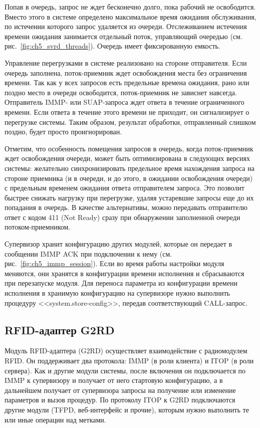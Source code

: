 Попав в очередь, запрос не ждет бесконечно долго, пока рабочий не освободится. Вместо этого в системе определено максимальное время ожидания обслуживания, по истечении которого запрос удаляется из очереди. Отслеживанием истечения времени ожидания занимается отдельный поток, управляющий очередью (см. рис.~\ref{fig:ch5_svrd_threads}). Очередь имеет фиксированную емкость.

Управление перегрузками в системе реализовано на стороне отправителя. Если очередь заполнена, поток-приемник ждет освобождения места без ограничения времени. Так как у всех запросов есть предельные времена ожидания, рано или поздно место в очереди освободится, поток-приемник не зависнет навсегда. Отправитель IMMP- или SUAP-запроса ждет ответа в течение ограниченного времени. Если ответа в течение этого времени не приходит, он сигнализирует о перегрузке системы. Таким образом, результат обработки, отправленный слишком поздно, будет просто проигнорирован.

Отметим, что особенность помещения запросов в очередь, когда поток-приемник ждет освобождения очереди, может быть оптимизирована в следующих версиях системы: желательно синхронизировать предельное время нахождения запроса на стороне приемника (и в очереди, и до этого, в ожидании освобождения очереди) с предельным временем ожидания ответа отправителем запроса. Это позволит быстрее снижать нагрузку при перегрузке, удаляя устаревшие запросы еще до их попадания в очередь. В качестве альтернативы, можно передавать отправителю ответ с кодом 411 (Not Ready) сразу при обнаружении заполненной очереди потоком-приемником.

Супервизор хранит конфигурацию других модулей, которые он передает в сообщении IMMP ACK при подключении к нему (см. рис.~\ref{fig:ch5_immp_session}). Если во время работы настройки модуля меняются, они хранятся в конфигурации времени исполнения и сбрасываются при перезапуске модуля. Для переноса параметра из конфигурации времени исполнения в хранимую конфигурацию на супервизоре нужно выполнить процедуру <<system.store-config>>, передав соответствующий CALL-запрос.


\subsection{RFID-адаптер G2RD}\label{sec:ch5_components_g2rd}

Модуль RFID-адаптера (G2RD) осуществляет взаимодействие с радиомодулем RFID. Он поддерживает два протокола: IMMP (в роли клиента) и ITOP (в роли сервера). Как и другие модули системы, после включения он подключается по IMMP к супервизору и получает от него стартовую конфигурацию, а в дальнейшем получает от супервизора запросы на получение или изменение параметров и вызов процедур. По протоколу ITOP к G2RD подключаются другие модули (TFPD, веб-интерфейс и прочие), которым нужно выполнить те или иные операции над метками.

